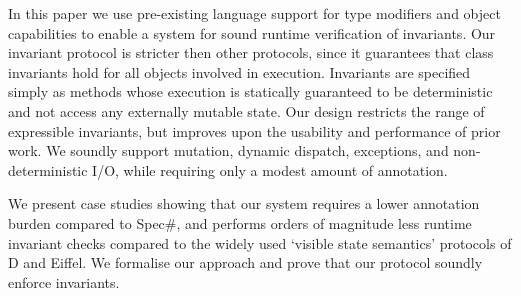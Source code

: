 In this paper we use pre-existing language support for type modifiers and object capabilities to enable a system for sound runtime verification of invariants.
Our invariant protocol is stricter then other  protocols, since it guarantees that class invariants hold for all objects involved in execution.
Invariants are specified simply as methods whose execution is statically guaranteed to be deterministic and not access any externally mutable state.
Our design restricts the range of expressible invariants, but improves upon the usability and performance of prior work.
We soundly support mutation, dynamic dispatch, exceptions, and non-deterministic I/O, while requiring only a modest amount of annotation.

We present case studies showing that our system requires a lower annotation burden compared to Spec\#, and  performs orders of magnitude less runtime invariant checks compared to the widely used `visible state semantics' protocols of D and Eiffel.
We formalise our approach and prove that our protocol soundly enforce invariants.
